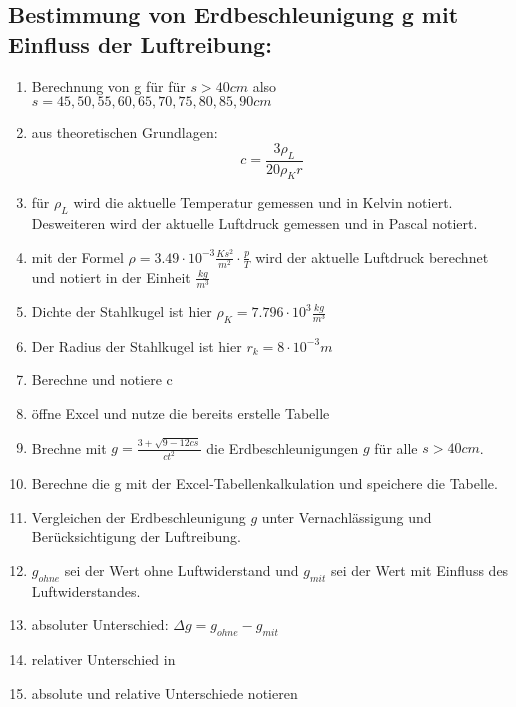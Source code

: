 \documentclass{protokoll}
\begin{document}


\subsection{Bestimmung von Erdbeschleunigung g mit Einfluss der Luftreibung:}
\begin{enumerate}

\item Berechnung von g für für $s > 40cm$ also $s = 45, 50, 55, 60, 65, 70, 75, 80, 85, 
90cm $
\item aus theoretischen Grundlagen:
\begin{equation}
c = \frac{3 \rho_L}{20 \rho_K r}
\end{equation}


\item für $ \rho_L $ wird die aktuelle Temperatur gemessen und in Kelvin notiert.
Desweiteren wird der aktuelle Luftdruck gemessen und in Pascal notiert.
\item mit der Formel $ \rho = 3.49\cdot 10^{-3} \frac{Ks^2}{m^2}\cdot 
\frac{p}{T} $ wird der aktuelle Luftdruck berechnet
und notiert in der Einheit $\frac{kg}{m^3}$
\item Dichte der Stahlkugel ist hier $\rho_K = 7.796\cdot 10^3 \frac{kg}{m^3}$
\item Der Radius der Stahlkugel ist hier $ r_k = 8\cdot 10^{-3} m $
\item Berechne und notiere c 
\item öffne Excel und nutze die bereits erstelle Tabelle
\item Brechne mit $ g = \frac{3 + \sqrt{9 - 12cs}}{ct^2} $ die Erdbeschleunigungen 
$g$ für alle $s > 40cm$.
\item Berechne die g mit der Excel-Tabellenkalkulation und speichere die Tabelle.
\item Vergleichen der Erdbeschleunigung $g$ unter Vernachlässigung und Berücksichtigung 
der Luftreibung.
\item $g_{ohne}$ sei der Wert ohne Luftwiderstand und $g_{mit}$ sei der Wert mit Einfluss 
des Luftwiderstandes.
\item absoluter Unterschied: $ \Delta g = g_{ohne} - g_{mit} $
\item relativer Unterschied in %
\item absolute und relative Unterschiede notieren

\end{enumerate}
\end{document}
